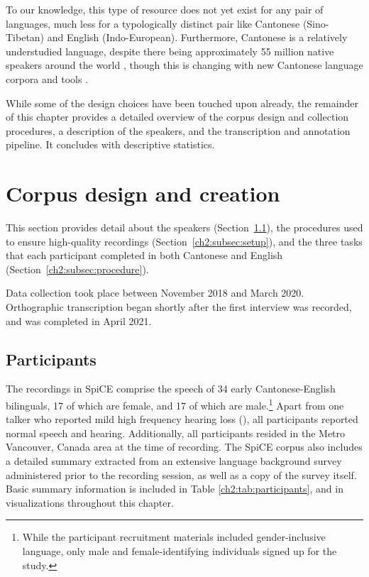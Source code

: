 To our knowledge, this type of resource does not yet exist for any pair of languages, much less for a typologically distinct pair like Cantonese (Sino-Tibetan) and English (Indo-European). Furthermore, Cantonese is a relatively understudied language, despite there being approximately 55 million native speakers around the world \citep{matthews_2013_cantonese}, though this is changing with new Cantonese language corpora \citep{luke_2015_hkc,leung_2001_hkcac,winterstein_2020_cantomap,alderete_2019_tone} and tools \citep{lee_2018_pycantonese,yau_2019_pyjyutping}.

While some of the design choices have been touched upon already, the remainder of this chapter provides a detailed overview of the corpus design and collection procedures, a description of the speakers, and the transcription and annotation pipeline. It concludes with descriptive statistics. 

\section{Corpus design and creation}\label{ch2:sec:design}

This section provides detail about the speakers (Section~\ref{ch2:subsec:participants}), the procedures used to ensure high-quality recordings (Section~\ref{ch2:subsec:setup}), and the three tasks that each participant completed in both Cantonese and English (Section~\ref{ch2:subsec:procedure}). 

Data collection took place between November 2018 and March 2020. Orthographic transcription began shortly after the first interview was recorded, and was completed in April 2021.

\subsection{Participants}\label{ch2:subsec:participants} 
The recordings in SpiCE comprise the speech of 34 early Cantonese-English bilinguals, 17 of which are female, and 17 of which are male.\footnote{While the participant recruitment materials included gender-inclusive language, only male and female-identifying individuals signed up for the study.} Apart from one talker who reported mild high frequency hearing loss (), all participants reported normal speech and hearing. Additionally, all participants resided in the Metro Vancouver, Canada area at the time of recording. The SpiCE corpus also includes a detailed summary extracted from an extensive language background survey administered prior to the recording session, as well as a copy of the survey itself. Basic summary information is included in Table \ref{ch2:tab:participants}, and in visualizations throughout this chapter. 


